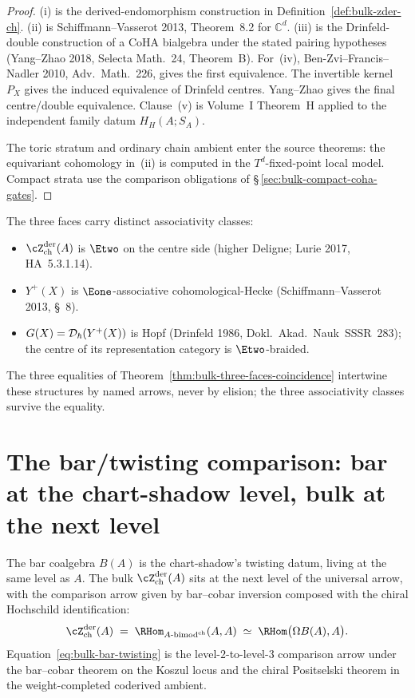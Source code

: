 \begin{proof}
(i) is the derived-endomorphism construction in
Definition~\ref{def:bulk-zder-ch}.
(ii) is Schiffmann--Vasserot 2013, Theorem~8.2
for $\mathbb C^d$. (iii) is
the Drinfeld-double construction of a CoHA bialgebra under the stated
pairing hypotheses (Yang--Zhao 2018, Selecta Math.\ 24, Theorem~B).
For~(iv), Ben-Zvi--Francis--Nadler 2010, Adv.\ Math.\ 226, gives the
first equivalence. The invertible kernel~$P_X$ gives the induced
equivalence of Drinfeld centres. Yang--Zhao gives the final
centre/double equivalence. Clause~(v) is Volume~I Theorem~H applied to
the independent family datum $H_H(A;S_A)$.

The toric stratum and ordinary chain ambient enter the source
theorems: the equivariant cohomology in~(ii) is computed in the
$T^d$-fixed-point local model. Compact strata use the comparison
obligations of \S\,\ref{sec:bulk-compact-coha-gates}.
\end{proof}

\begin{remark}
\label{rem:bulk-three-associativity-classes}
The three faces carry distinct associativity classes:
\begin{itemize}[leftmargin=1.6em,itemsep=1pt]
\item $\cZ^{\mathrm{der}}_{\mathrm{ch}}(A)$ is $\Etwo$ on the centre side
(higher Deligne; Lurie 2017, HA~5.3.1.14).
\item $Y^{+}(X)$ is $\Eone$-associative cohomological-Hecke
(Schiffmann--Vasserot 2013, \S~8).
\item $G(X) = \mathcal D_{\hbar}(Y^{+}(X))$ is Hopf
(Drinfeld 1986, Dokl.~Akad.~Nauk~SSSR~283); the centre of its
representation category is $\Etwo$-braided.
\end{itemize}
The three equalities of Theorem~\ref{thm:bulk-three-faces-coincidence}
intertwine these structures by named arrows, never by elision; the
three associativity classes survive the equality.
\end{remark}

\section{The bar/twisting comparison: bar at the chart-shadow level, bulk at the next level}
\label{sec:bulk-bar-twisting}

The bar coalgebra $B(A)$ is the chart-shadow's twisting datum, living
at the same level as $A$. The bulk
$\cZ^{\mathrm{der}}_{\mathrm{ch}}(A)$ sits at the next level of the
universal arrow, with the comparison arrow given by bar--cobar
inversion composed with the chiral Hochschild identification:
\begin{equation}
 \label{eq:bulk-bar-twisting}
 \cZ^{\mathrm{der}}_{\mathrm{ch}}(A)
 \;=\; \RHom_{A\text{-bimod}^{\mathrm{ch}}}(A, A)
 \;\simeq\; \RHom\bigl(\Omega B(A), A\bigr).
\end{equation}
Equation~\eqref{eq:bulk-bar-twisting} is the level-$2$-to-level-$3$
comparison arrow under the bar--cobar theorem on the Koszul locus and
the chiral Positselski theorem in the weight-completed coderived
ambient.

